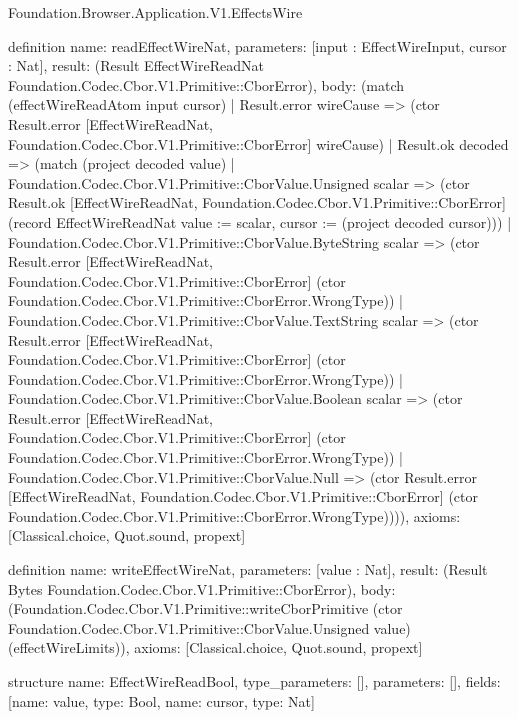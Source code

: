 \begin{lexlean}{Foundation.Browser.Application.V1.EffectsWire}
\begin{semanticmodule}
definition{
  name: readEffectWireNat,
  parameters: [input : EffectWireInput, cursor : Nat],
  result: (Result EffectWireReadNat Foundation.Codec.Cbor.V1.Primitive::CborError),
  body: (match (effectWireReadAtom input cursor)
    | Result.error wireCause => (ctor Result.error [EffectWireReadNat, Foundation.Codec.Cbor.V1.Primitive::CborError] wireCause)
    | Result.ok decoded => (match (project decoded value)
      | Foundation.Codec.Cbor.V1.Primitive::CborValue.Unsigned scalar => (ctor Result.ok [EffectWireReadNat, Foundation.Codec.Cbor.V1.Primitive::CborError] (record EffectWireReadNat {value := scalar, cursor := (project decoded cursor)}))
      | Foundation.Codec.Cbor.V1.Primitive::CborValue.ByteString scalar => (ctor Result.error [EffectWireReadNat, Foundation.Codec.Cbor.V1.Primitive::CborError] (ctor Foundation.Codec.Cbor.V1.Primitive::CborError.WrongType))
      | Foundation.Codec.Cbor.V1.Primitive::CborValue.TextString scalar => (ctor Result.error [EffectWireReadNat, Foundation.Codec.Cbor.V1.Primitive::CborError] (ctor Foundation.Codec.Cbor.V1.Primitive::CborError.WrongType))
      | Foundation.Codec.Cbor.V1.Primitive::CborValue.Boolean scalar => (ctor Result.error [EffectWireReadNat, Foundation.Codec.Cbor.V1.Primitive::CborError] (ctor Foundation.Codec.Cbor.V1.Primitive::CborError.WrongType))
      | Foundation.Codec.Cbor.V1.Primitive::CborValue.Null => (ctor Result.error [EffectWireReadNat, Foundation.Codec.Cbor.V1.Primitive::CborError] (ctor Foundation.Codec.Cbor.V1.Primitive::CborError.WrongType)))),
  axioms: [Classical.choice, Quot.sound, propext]
}

definition{
  name: writeEffectWireNat,
  parameters: [value : Nat],
  result: (Result Bytes Foundation.Codec.Cbor.V1.Primitive::CborError),
  body: (Foundation.Codec.Cbor.V1.Primitive::writeCborPrimitive (ctor Foundation.Codec.Cbor.V1.Primitive::CborValue.Unsigned value) (effectWireLimits)),
  axioms: [Classical.choice, Quot.sound, propext]
}

structure{
  name: EffectWireReadBool,
  type_parameters: [],
  parameters: [],
  fields: [{name: value, type: Bool}, {name: cursor, type: Nat}]
}


\end{semanticmodule}
\end{lexlean}
